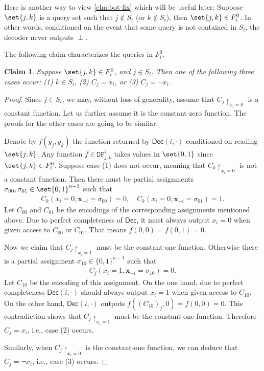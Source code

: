 \documentclass[10pt,a4paper]{article}
\newtheorem{claim}{Claim}
\theoremstyle{remark}
\newcommand{\zo}{\ensuremath{{\{0,1\}}}\xspace}
\def\*#1{\mathbf{#1}}
\newcommand{\Dec}{\ensuremath{\mathsf{Dec}}\xspace}
\begin{document}
Here is another way to view \cref{clm:bot-fix} which will be useful later: Suppose $\set{j, k}$ is a query set such that $j \notin S_i$ (or $k \notin S_i$), then $\set{j, k} \in F_{i}^{0}$. In other words, conditioned on the event that some query is not contained in $S_i$, the decoder never outputs $\perp$.

The following claim characterizes the queries in $F_i^{0}$.
\begin{claim} \label{clm:fixable-or-useless}
Suppose $\set{j,k} \in F_{i}^{0}$, and $j \in S_i$. Then one of the following three cases occur: (1) $k \in S_i$, (2) $C_j=x_i$, or (3) $C_j=\neg x_i$.
\end{claim}
\begin{proof}
Since $j \in S_i$, we may, without loss of generality, assume that $C_j\restriction_{x_i=0}$ is a constant function. Let us further assume it is the constant-zero function. The proofs for the other cases are going to be similar. 

Denote by $f(y_j, y_k)$ the function returned by $\Dec(i,\cdot)$ conditioned on reading $\set{j,k}$. Any function $f \in \mathtt{DF}_{j,k}^i$ takes values in $\set{0,1}$ since $\set{j,k} \in F_i^{0}$. Suppose case (1) does not occur, meaning that $C_k\restriction_{x_i=0}$ is not a constant function. Then there must be partial assignments $\sigma_{00}, \sigma_{01} \in \set{0,1}^{n-1}$ such that
\begin{align*}
    C_k(x_i=0, \*x_{-i}=\sigma_{00}) = 0, \quad C_k(x_i=0, \*x_{-i}=\sigma_{01}) = 1.
\end{align*}
Let $C_{00}$ and $C_{01}$ be the encodings of the corresponding assignments mentioned above. Due to perfect completeness of $\Dec$, it must always output $x_i = 0$ when given access to $C_{00}$ or $C_{01}$. That means $f(0,0)=f(0,1)=0$.

Now we claim that $C_j\restriction_{x_i=1}$ must be the constant-one function. Otherwise there is a partial assignment $\sigma_{10} \in \zo^{n-1}$ such that
\begin{align*}
    C_j(x_i=1, \*x_{-i}=\sigma_{10}) = 0.
\end{align*}
Let $C_{10}$ be the encoding of this assignment. On the one hand, due to perfect completeness $\Dec(i,\cdot)$ should always output $x_i=1$ when given access to $C_{10}$. On the other hand, $\Dec(i,\cdot)$ outputs $f((C_{10})_j,0)=f(0,0)=0$. This contradiction shows that $C_j\restriction_{x_i=1}$ must be the constant-one function. Therefore $C_j=x_i$, i.e., case (2) occurs.

Similarly, when $C_j\restriction_{x_i=0}$ is the constant-one function, we can deduce that $C_j=\neg x_i$, i.e., case (3) occurs.
\end{proof}
\end{document}
